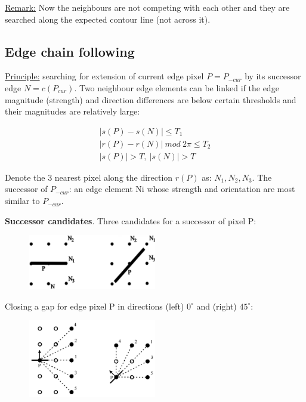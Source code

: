 \documentclass[letterpaper,12pt]{article}
\begin{document}
\underline{Remark:} Now the neighbours are not competing with each other and they are searched along the expected contour line (not across it).


\subsection{Edge chain following}

\underline{Principle:} searching for extension of current edge pixel $P=P_{-cur}$ by its successor edge $N=c(P_{cur})$.
Two neighbour edge elements can be linked if the edge magnitude (strength) and direction differences are below certain thresholds and their magnitudes are relatively large:

\begin{gather}
	|s(P)-s(N)|\leq T_1 \\
	|r(P)-r(N)|\ mod\ 2\pi\leq T_2 \\
	|s(P)|>T,\ |s(N)|>T
\end{gather}

Denote the 3 nearest pixel along the direction $r(P)$ as: $N_1, N_2, N_3$. The successor of $P_{-cur}$: an edge element Ni whose strength and
 orientation are most similar to $P_{-cur}$.

\textbf{Successor candidates}. Three candidates for a successor of pixel P:

\begin{figure}[!th]
  \centering
  {\includegraphics[width=0.5\textwidth]{succ_cand1}\label{fig:succ_cand1}}
  \end{figure}

Closing a gap for edge pixel P in directions (left) $0^\circ$ and (right) $45^\circ$:
\begin{figure}[!th]
  \centering
  {\includegraphics[width=0.5\textwidth]{succ_cand2}\label{fig:succ_cand2}}
  \end{figure}
  
\end{document}

